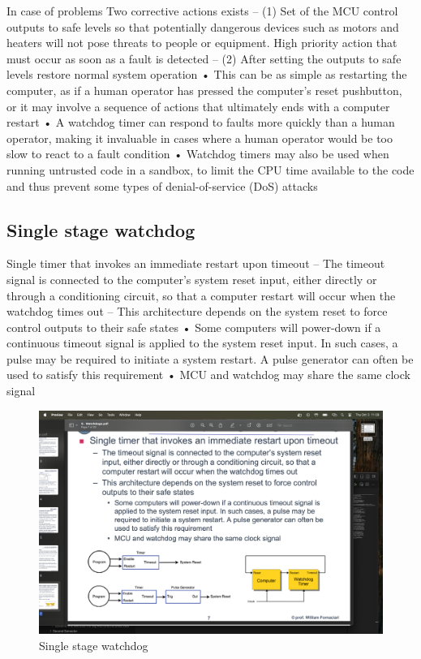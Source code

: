 In case of problems Two corrective actions exists
– (1) Set of the MCU control outputs to safe levels so that potentially
dangerous devices such as motors and heaters will not pose threats
to people or equipment. High priority action that must occur as soon
as a fault is detected
– (2) After setting the outputs to safe levels restore normal system
operation
• This can be as simple as restarting the computer, as if a human
operator has pressed the computer’s reset pushbutton, or it may
involve a sequence of actions that ultimately ends with a computer
restart
• A watchdog timer can respond to faults more quickly than a human
operator, making it invaluable in cases where a human operator would
be too slow to react to a fault condition
• Watchdog timers may also be used when running untrusted code in a
sandbox, to limit the CPU time available to the code and thus prevent
some types of denial-of-service (DoS) attacks


\subsection{Single stage watchdog}
Single timer that invokes an immediate restart upon timeout
– The timeout signal is connected to the computer’s system reset
input, either directly or through a conditioning circuit, so that a
computer restart will occur when the watchdog times out
– This architecture depends on the system reset to force control
outputs to their safe states
• Some computers will power-down if a continuous timeout signal is
applied to the system reset input. In such cases, a pulse may be
required to initiate a system restart. A pulse generator can often be
used to satisfy this requirement
• MCU and watchdog may share the same clock signal
\begin{figure}[H]
    \centering
    \includegraphics[width=0.75\linewidth]{images/swdog.png}
    \caption{Single stage watchdog}
\end{figure}

